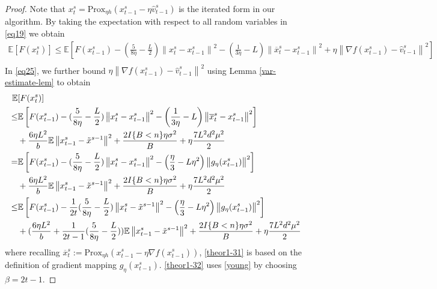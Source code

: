 \documentclass{article}
\newcommand*{\Po}{\text{Prox}}
\newcommand*{\E}{\mathbb{E}}
\newcommand{\norm}[1]{\left\lVert#1\right\rVert}
\theoremstyle{definition}
\theoremstyle{remark}
\begin{document}
\begin{proof}
Note that $x_t^s = \Po_{\eta h}(x_{t-1}^s - \eta \hat{v}_{t-1}^s)$ is the iterated form in our algorithm.  By taking the expectation with respect to all random variables in \eqref{eq19} we obtain
 \begin{equation}\label{eq25}
 \begin{split} 
\E[F({x}_{t}^s)] \leq \E\left[F({x}_{t-1}^s)  -(\frac{5}{8\eta} - \frac{L}{2})\norm{{x}_t^s-x_{t-1}^s}^2- \left(\frac{1}{3\eta}-L\right)\norm{\overline{x}_t^s-x_{t-1}^s}^2+\eta \norm{\nabla f(x_{t-1}^s)-\hat{v}_{t-1}^s}^2\right]\\
 \end{split}
 \end{equation}
In \eqref{eq25}, we further bound $\eta \norm{\nabla f(x_{t-1}^s)-\hat{v}_{t-1}^s}^2$ using Lemma \ref{var-estimate-lem} to obtain
 \begin{align} 
\E&[F({x}_{t}^s)] \notag
\notag
\\ \leq& \E\left[F({x}_{t-1}^s)  -(\frac{5}{8\eta} - \frac{L}{2})\norm{{x}_t^s-x_{t-1}^s}^2- \left(\frac{1}{3\eta}-L\right)\norm{\overline{x}_t^s-x_{t-1}^s}^2\right]\notag\\
&+ \frac{6\eta L^2}{b}\E\norm{x_{t-1}^s-\tilde{x}^{s-1}}^2 + \frac{2I\{B < n\}\eta \sigma ^2}{B}+\eta \frac{7 L^2 d^2 \mu^2}{2}\notag
\\ =& \E\left[F({x}_{t-1}^s)  -(\frac{5}{8\eta} - \frac{L}{2})\norm{{x}_t^s-x_{t-1}^s}^2- \left(\frac{\eta}{3}-L\eta^2\right)\norm{g_{\eta}(x_{t-1}^s)}^2\right]\notag
\\&+\frac{6\eta L^2}{b}\E\norm{x_{t-1}^s-\tilde{x}^{s-1}}^2+ \frac{2I\{B < n\}\eta \sigma ^2}{B}+\eta \frac{7L^2 d^2 \mu^2}{2}\label{theor1-31}
\\ \leq& \E\left[F({x}_{t-1}^s)  -\frac{1}{2t}(\frac{5}{8\eta} - \frac{L}{2})\norm{{x}_t^s-\tilde{x}^{s-1}}^2- \left(\frac{\eta}{3}-L\eta^2\right)\norm{g_{\eta}(x_{t-1}^s)}^2\right]\notag\\
&+(\frac{6\eta L^2}{b}+\frac{1}{2t-1}(\frac{5}{8\eta} - \frac{L}{2}))\E\norm{x_{t-1}^s-\tilde{x}^{s-1}}^2
+ \frac{2I\{B < n\}\eta \sigma ^2}{B}+\eta \frac{7 L^2 d^2 \mu^2}{2}\label{theor1-32}
 \end{align}
where recalling $\overline{x}_t^s := \Po_{\eta h}(x_{t-1}^s - \eta \nabla f(x_{t-1}^s))$, \eqref{theor1-31}  is based on the definition of gradient mapping $g_{\eta}(x_{t-1}^s)$. \eqref{theor1-32} uses \eqref{young} by choosing $\beta = 2t-1$.
 

\end{proof}
\end{document}
